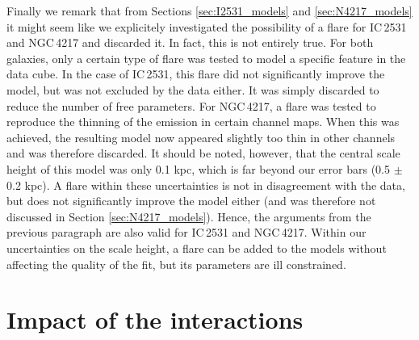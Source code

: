 \documentclass{aa}
\begin{document}
\par
Finally we remark that from Sections \ref{sec:I2531_models} and \ref{sec:N4217_models} it might seem like we explicitely investigated the possibility of a flare for IC\,2531 and NGC\,4217 and discarded it. In fact, this is not entirely true. For both galaxies, only a certain type of flare was tested to model a specific feature in the data cube. In the case of IC\,2531, this flare did not significantly improve the model, but was not excluded by the data either. It was simply discarded to reduce the number of free parameters. For NGC\,4217, a flare was tested to reproduce the thinning of the emission in certain channel maps. When this was achieved, the resulting model now appeared slightly too thin in other channels and was therefore discarded. It should be noted, however, that the central scale height of this model was only 0.1 kpc, which is far beyond our error bars (0.5 $\pm$ 0.2 kpc). A flare within these uncertainties is not in disagreement with the data, but does not significantly improve the model either (and was therefore not discussed in Section \ref{sec:N4217_models}). Hence, the arguments from the previous paragraph are also valid for IC\,2531 and NGC\,4217. Within our uncertainties on the scale height, a flare can be added to the models without affecting the quality of the fit, but its parameters are ill constrained.


\section{Impact of the interactions}
\label{sec:discussion}
\end{document}
